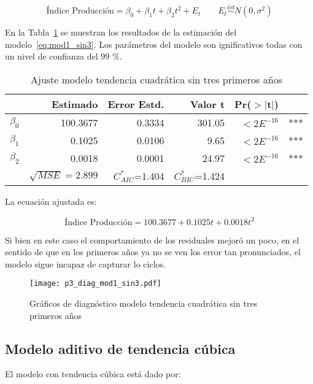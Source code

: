 \documentclass{tufte-handout}
\begin{document}
\begin{equation} \label{eq:mod1_sin3}
	\text{Índice Producción} = \beta_0 + \beta_1 t + \beta_2 t^2 + E_t
	\qquad E_t \stackrel{iid}{\sim} N(0, \sigma^2)
\end{equation}

En la Tabla~\ref{tab:mod1_sin3} se muestran los resultados de la estimación del modelo~\ref{eq:mod1_sin3}. Los parámetros del modelo son ignificativos todas con un nivel de confianza del 99 \%. 

\begin{table}[ht]
\centering
\begin{tabular}{lrrrrl}
            & Estimado & Error Estd. & Valor t & Pr($>$$|$t$|$) & \\ 
  \hline
  $\beta_0$ & 100.3677 & 0.3334 & 301.05 & $< 2E^{-16}$ & *** \\ 
  $\beta_1$ & 0.1025 & 0.0106 & 9.65 & $< 2E^{-16}$ & *** \\ 
  $\beta_2$ & 0.0018 & 0.0001 & 24.97 & $< 2E^{-16}$ & *** \\ 
   \hline
   & $\sqrt{MSE}=2.899$ & $C^{*}_{AIC}$=1.404 & $C^{*}_{BIC}$=1.424 & \\
   \hline
\end{tabular}
\caption{Ajuste modelo tendencia cuadrática sin tres primeros años} 
\label{tab:mod1_sin3}
\end{table}

La ecuación ajustada es:

\begin{equation}
	\text{Índice Producción} = 100.3677 + 0.1025 t + 0.0018 t^2
\end{equation}

Si bien en este caso el comportamiento de los residuales mejoró un poco, en el sentido de que en los primeros años ya no se ven los error tan pronunciados, el modelo sigue incapaz de capturar lo ciclos.

\begin{figure*}[!ht]
    \texttt{[image: p3\_diag\_mod1\_sin3.pdf]}
    \caption{Gráficos de diagnóstico modelo tendencia cuadrática sin tres primeros años}
    \label{fig:p3_diag_mod1_sin3.pdf}
\end{figure*}

\subsection*{Modelo aditivo de tendencia cúbica}

El modelo con tendencia cúbica está dado por:
\end{document}
